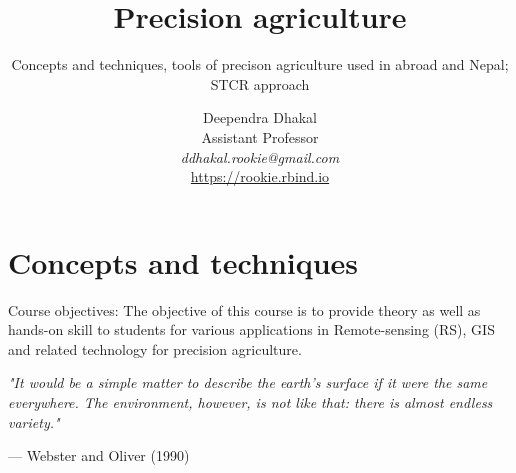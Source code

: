 \documentclass[11pt,dvipsnames,ignorenonframetext,aspectratio=169]{beamer}
\title[]{Precision agriculture}
\subtitle{Concepts and techniques, tools of precison agriculture used
in abroad and Nepal; STCR approach}
\author[
        Deependra Dhakal\\
Assistant Professor\\
\textit{ddhakal.rookie@gmail.com}\\
\url{https://rookie.rbind.io}
    ]{Deependra Dhakal\\
Assistant Professor\\
\textit{ddhakal.rookie@gmail.com}\\
\url{https://rookie.rbind.io}}
\date[
      
  ]{
    }
\begin{document}
  \begin{frame}[plain]
  \titlepage
  \end{frame}



\hypertarget{concepts-and-techniques}{%
\section{Concepts and techniques}\label{concepts-and-techniques}}

\begin{frame}{}
\protect\hypertarget{section}{}
\begin{alert}{Course objectives:}
The objective of this course is to provide theory as well as hands-on skill to students for various applications in Remote-sensing (RS), GIS and related technology for precision agriculture.
\end{alert}

\textit{"It would be a simple matter to describe the earth's surface if it were the same everywhere. The environment, however, is not like that: there is almost endless variety."}

\raggedleft --- Webster and Oliver (1990)
\end{frame}
\end{document}
